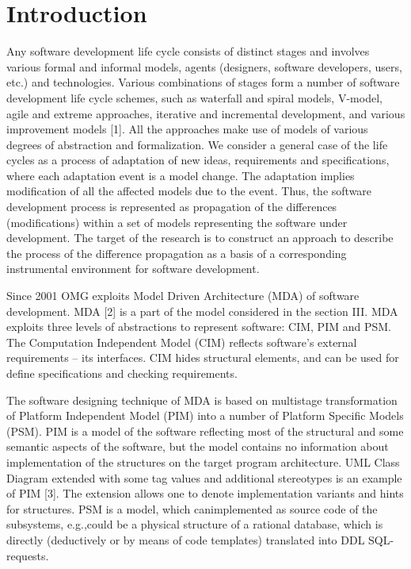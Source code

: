 \documentclass{intech}
\affiliation{Matrosov Institute for System Dynamics and Control Theory\\ of Siberian Branch of Russian Academy of Sciences, \\
Irkutsk National Research Technical University, Irkutsk}
\begin{document}
\maketitle

\section{Introduction}
Any software development life cycle consists of distinct stages and involves various formal and informal models, agents (designers, software developers, users, etc.) and technologies. Various combinations of stages form a number of software development life cycle schemes, such as waterfall and spiral models, V-model, agile and extreme approaches, iterative and incremental development, and various improvement models [1]. All the approaches make use of models of various degrees of abstraction and formalization. We consider a general case of the life cycles as a process of adaptation of new ideas, requirements and specifications, where each adaptation event is a model change. The adaptation implies modification of all the affected models due to the event. Thus, the software development process is represented as propagation of the differences (modifications) within a set of models representing the software under development. The target of the research is to construct an approach to describe the process of the difference propagation as a basis of a corresponding instrumental environment for software development.

Since 2001 OMG exploits Model Driven Architecture (MDA) of software development. MDA [2] is a part of the model considered in the section III. MDA exploits three levels of abstractions to represent software: CIM, PIM and PSM. The Computation Independent Model (CIM) reflects software’s external requirements – its interfaces. CIM hides structural elements, and can be used for define specifications and checking requirements.

The software designing technique of MDA is based on multistage transformation of Platform Independent Model (PIM) into a number of Platform Specific Models (PSM). PIM is a model of the software reflecting most of the structural and some semantic aspects of the software, but the model contains no information about implementation of the structures on the target program architecture. UML Class Diagram extended with some tag values and additional stereotypes is an example of PIM [3]. The extension allows one to denote implementation variants and hints for structures. PSM is a model, which canimplemented as source code of the subsystems, e.g.,could be a physical structure of a rational database, which is directly (deductively or by means of code templates) translated into DDL SQL-requests.
\end{document}
